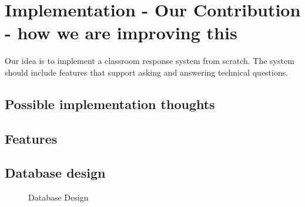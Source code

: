 \documentclass{article}
\begin{document}
\section{Implementation - Our Contribution - how we are improving this}
Our idea is to implement a classroom response system from scratch. The system should include features that support asking and answering technical questions. 


\subsection{Possible implementation thoughts}

\subsection{Features} %




\subsection{Database design}


\begin{figure}[H]
\capstart
	\centering
	\caption{Database Design\label{fig:database-design}}
\end{figure}








\end{document}

